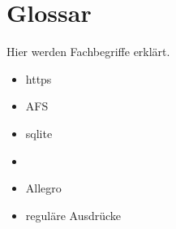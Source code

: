 
\chapter{Glossar}
Hier werden Fachbegriffe erklärt.
\begin{itemize}
  \item https
  \item AFS
  \item sqlite
  \item \BibTeX
  \item Allegro
  \item reguläre Ausdrücke
\end{itemize}
